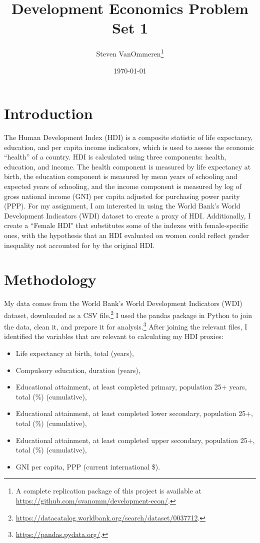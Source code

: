 \documentclass[12pt]{article}
\begin{document}
\title{Development Economics Problem Set 1}
\author{Steven VanOmmeren\thanks{A complete replication package of this project is available at \url{https://github.com/svanomm/development-econ/}.}}
\date{\today}
\maketitle

\doublespacing
\section{Introduction}
The Human Development Index (HDI) is a composite statistic of life expectancy, education, and per capita income indicators, which is used to assess the economic ``health'' of a country. HDI is calculated using three components: health, education, and income. The health component is measured by life expectancy at birth, the education component is measured by mean years of schooling and expected years of schooling, and the income component is measured by log of gross national income (GNI) per capita adjusted for purchasing power parity (PPP). For my assignment, I am interested in using the World Bank's World Development Indicators (WDI) dataset to create a proxy of HDI. Additionally, I create a ``Female HDI" that substitutes some of the indexes with female-specific ones, with the hypothesis that an HDI evaluated on women could reflect gender inequality not accounted for by the original HDI.

\section{Methodology}
My data comes from the World Bank's World Development Indicators (WDI) dataset, downloaded as a CSV file.\footnote{\url{https://datacatalog.worldbank.org/search/dataset/0037712}.} I used the \textsf{pandas} package in Python to join the data, clean it, and prepare it for analysis.\footnote{\url{https://pandas.pydata.org/}.} After joining the relevant files, I identified the variables that are relevant to calculating my HDI proxies:
\begin{itemize}
    \singlespace
    \item Life expectancy at birth, total (years),
    \item Compulsory education, duration (years),
    \item Educational attainment, at least completed primary, population 25+ years, total (\%) (cumulative),
    \item Educational attainment, at least completed lower secondary, population 25+, total (\%) (cumulative),
    \item Educational attainment, at least completed upper secondary, population 25+, total (\%) (cumulative),
    \item GNI per capita, PPP (current international \$).
\end{itemize}
\end{document}
